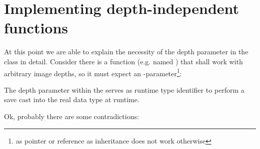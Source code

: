 \section{Implementing depth-independent functions}

At this point we are able to explain the necessity of the depth parameter in the  class in detail. Consider there is a function (e.g. named ) that shall work with arbitrary image depths, so it must expect an -parameter\footnote{as pointer or reference as inheritance does not work otherwise}:


The depth parameter within the  serves as runtime type identifier to perform a save cast into the real data type at runtime.


Ok, probably there are some contradictions:\\

